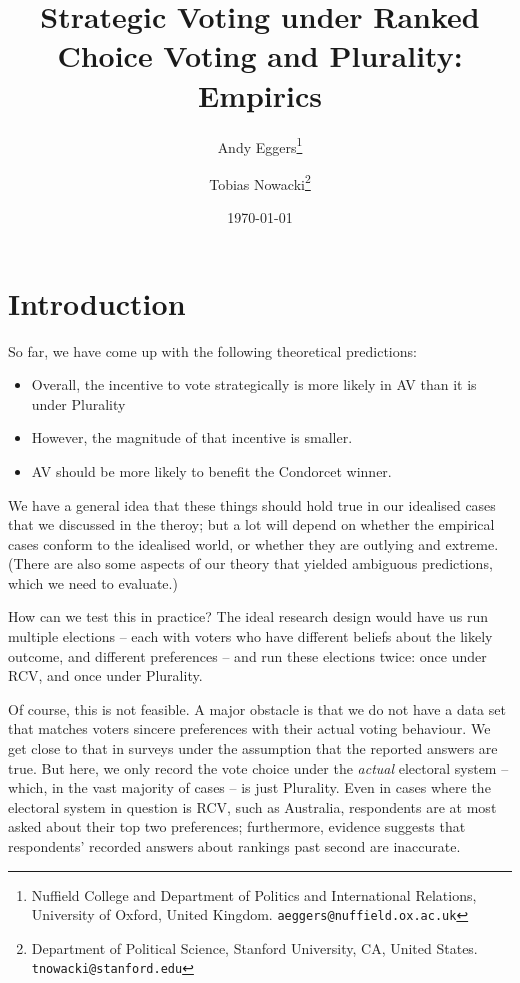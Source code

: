 \documentclass[11pt, letter, margin = 2 in]{article}
\begin{document}
\author{Andy Eggers\thanks{Nuffield College and Department of Politics and International Relations, University of Oxford, United Kingdom. \texttt{aeggers@nuffield.ox.ac.uk}}
\and
Tobias Nowacki\thanks{Department of Political Science, Stanford University, CA, United States. \texttt{tnowacki@stanford.edu}}}
\date{\today}
\title{Strategic Voting under Ranked Choice Voting and Plurality: Empirics}

\maketitle

\section{Introduction}

So far, we have come up with the following theoretical predictions:
\begin{itemize}
\item Overall, the incentive to vote strategically is more likely in AV than it is under Plurality
\item However, the magnitude of that incentive is smaller.
\item AV should be more likely to benefit the Condorcet winner.
\end{itemize}

We have a general idea that these things should hold true in our idealised cases that we discussed in the theroy; but a lot will depend on whether the empirical cases conform to the idealised world, or whether they are outlying and extreme. (There are also some aspects of our theory that yielded ambiguous predictions, which we need to evaluate.)

How can we test this in practice? The ideal research design would have us run multiple elections -- each with voters who have different beliefs about the likely outcome, and different preferences -- and run these elections twice: once under RCV, and once under Plurality.

Of course, this is not feasible. A major obstacle is that we do not have a data set that matches voters sincere preferences with their actual voting behaviour. We get close to that in surveys under the assumption that the reported answers are true. But here, we only record the vote choice under the \textit{actual} electoral system -- which, in the vast majority of cases -- is just Plurality. Even in cases where the electoral system in question is RCV, such as Australia, respondents are at most asked about their top two preferences; furthermore, evidence suggests that respondents' recorded answers about rankings past second are inaccurate.
\end{document}
